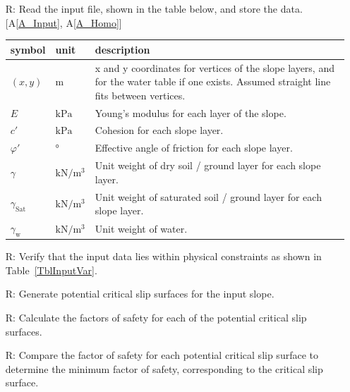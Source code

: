\documentclass[12pt]{article}
\newcommand{\aref}[1]{A\ref{#1}}
\renewcommand{\arraystretch}{1}
\newcounter{reqnum} %
\newcounter{tablenum} %
\begin{document}
\noindent \begin{itemize}

\item[R\refstepcounter{reqnum}\thereqnum \label{R_Inputs}:] Read the
  input file, shown in the table below, and store the data. [\aref{A_Input}, 
  \aref{A_Homo}]
  
  \renewcommand{\arraystretch}{1.5}
  \noindent \begin{longtable}{l l p{12cm}} \toprule \textbf{symbol} &
    {tablenum}  \label{Table:Inputs}
    \textbf{unit} & \textbf{description}\\ \midrule
    $\left(x,y\right)$ & $\text{m}$ & x and y coordinates for vertices
    of the slope layers, and for the water table if one exists.
    Assumed straight line fits between vertices.\\
    $E$ & $\text{kPa}$ & Young's modulus for each layer of the
    slope.\\
    $c'$ & $\text{kPa}$ & Cohesion for each slope layer. \\
    $\varphi'$ & \si{\degree} & Effective angle of friction for each
    slope layer. \\
    $\gamma$ & $\si{\kilo\newton\per\meter\cubed}$ & Unit weight of dry
    soil / ground layer for each slope layer. \\
    $\gamma_{\text{Sat}}$ & $\si{\kilo\newton\per\meter\cubed}$ & Unit
    weight of saturated soil / ground layer for each slope
    layer. \\
    $\gamma_{\text{w}}$ & $\si{\kilo\newton\per\meter\cubed}$ & Unit
    weight of water. \\ \bottomrule
\end{longtable}

\item[R\refstepcounter{reqnum}\thereqnum \label{R_KinAdm}:] Verify that the 
input data lies within physical constraints as shown in 
Table~\ref{TblInputVar}.

\item[R\refstepcounter{reqnum}\thereqnum \label{R_InitGen}:] Generate
potential critical slip surfaces for the input slope. 

\item[R\refstepcounter{reqnum}\thereqnum \label{R_FS}:] Calculate the
  factors of safety for each of the potential critical slip surfaces.

\item[R\refstepcounter{reqnum}\thereqnum \label{R_Minimize}:] Compare the 
factor of safety for each potential critical slip surface to determine the 
minimum factor of safety, corresponding to the critical slip surface.


\end{itemize}
\end{document}
